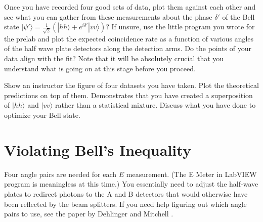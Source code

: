\documentclass{../lab}
\begin{document}
Once you have recorded four good sets of data, plot them against each other and see what you can gather from these measurements about the phase $\delta'$ of the Bell state $|\psi' \rangle = \frac{1}{\sqrt{2}} (|hh\rangle + e^{i\delta'} |vv\rangle)$? If unsure, use the little program you wrote for the prelab and plot the expected coincidence rate as a function of various angles of the half wave plate detectors along the detection arms. Do the points of your data align with the fit? Note that it will be absolutely crucial that you understand what is going on at this stage before you proceed.

  Show an instructor the figure of four datasets you have taken. Plot the theoretical predictions on top of them. Demonstrates that you have created a superposition of $|hh\rangle$ and $|vv\rangle$ rather than a statistical mixture. Discuss what you have done to optimize your Bell state.





\section{Violating Bell's Inequality}

Four angle pairs are needed for each $E$ measurement. (The E Meter in LabVIEW program is meaningless at this time.) You essentially need to adjust the half-wave plates to redirect photons to the A and B detectors that would otherwise have been reflected by the beam splitters. If you need help figuring out which angle pairs to use, see the paper by Dehlinger and Mitchell \cite{Dehlinger}.
\end{document}
